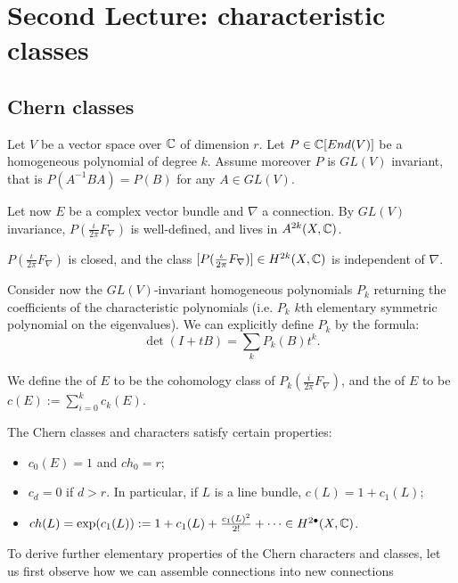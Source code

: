 \section{Second Lecture: characteristic classes}
\subsection{Chern classes}
Let $V$ be a vector space over $\mathbb C$ of dimension $r$. Let $P\in \mathbb C[End(V)]$ be a homogeneous polynomial of degree $k$. Assume moreover $P$ is $GL(V)$ invariant, that is $P(A^{-1}BA)=P(B)$ for any $A\in GL(V)$.

Let now $E$ be a complex vector bundle and $\nabla$ a connection. By $GL(V)$ invariance, $P(\frac{\iota}{2\pi}F_\nabla)$ is well-defined, and lives in $A^{2k}(X,\mathbb C)$.
\begin{fact}
	$P(\frac{\iota}{2\pi}F_\nabla)$ is closed, and the class $[P(\frac{\iota}{2\pi}F_\nabla)]\in H^{2k}(X,\mathbb C)$ is independent of $\nabla$.
\end{fact}
Consider now the $GL(V)$-invariant homogeneous polynomials $P_k$ returning the coefficients of the characteristic polynomials (i.e. $P_k$ $k$th elementary symmetric polynomial on the eigenvalues). We can explicitly define $P_k$ by the formula:
\[
\det(I+tB)=\sum_kP_k(B)t^k.
\]

We define the  of $E$ to be the cohomology class of $P_k(\frac{i}{2\pi}F_\nabla)$, and the  of $E$ to be $c(E):=\sum_{i=0}^kc_k(E)$.

The Chern classes and characters satisfy certain properties:
\begin{itemize}
	\item $c_0(E)=1$ and $ch_0=r$;
	\item $c_d=0$ if $d>r$. In particular, if $L$ is a line bundle, $c(L)=1+c_1(L)$;
	\item $ch(L)=\exp(c_1(L)):=1+c_1(L)+\frac{c_1(L)^2}{2!}+\cdots\in H^{2\bullet}(X,\mathbb C)$.
\end{itemize}

To derive further elementary properties of the Chern characters and classes, let us first observe how we can assemble connections into new connections

